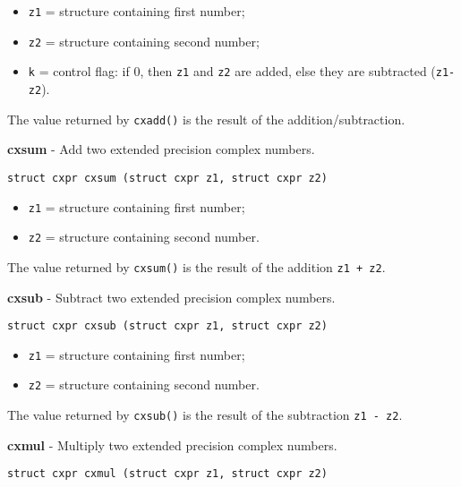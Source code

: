 \documentclass{article}
\begin{document}
\begin{itemize}
\item \texttt{z1} = structure containing first number;
\item \texttt{z2} = structure containing second number;
\item \texttt{k} = control flag: if 0, then  \texttt{z1} and \texttt{z2} are added,
else they are subtracted (\texttt{z1-z2}).
\end{itemize}

The value returned by \texttt{cxadd()} is the result
of the addition/subtraction.


\hrulefill{}

\textbf{cxsum} - Add two extended precision complex numbers.

\begin{verbatim}
struct cxpr cxsum (struct cxpr z1, struct cxpr z2)
\end{verbatim}

\begin{itemize}
\item \texttt{z1} = structure containing first number;
\item \texttt{z2} = structure containing second number.
\end{itemize}

The value returned by \texttt{cxsum()} is the result
of the addition \texttt{z1 + z2}.


\hrulefill{}

\textbf{cxsub} - Subtract two extended precision complex numbers.

\begin{verbatim}
struct cxpr cxsub (struct cxpr z1, struct cxpr z2)
\end{verbatim}

\begin{itemize}
\item \texttt{z1} = structure containing first number;
\item \texttt{z2} = structure containing second number.
\end{itemize}

The value returned by \texttt{cxsub()} is the result
of the subtraction \texttt{z1 - z2}.


\hrulefill{}

\textbf{cxmul} - Multiply two extended precision complex numbers.

\begin{verbatim}
struct cxpr cxmul (struct cxpr z1, struct cxpr z2)
\end{verbatim}
\end{document}
